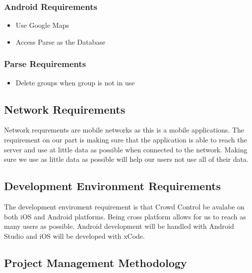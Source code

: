 \subsubsection{Android Requirements}
\begin{itemize}
\item{Use Google Maps}
\item{Access Parse as the Database}
\end{itemize}
\subsubsection{Parse Requirements}
\begin{itemize}
\item{Delete groups when group is not in use}
\end{itemize}

\subsection{Network Requirements}

Network requrements are mobile networks as this is a mobile applications. The requirement on our part is making sure that the application is able to reach the server and use at little data as possible when connected to the network. Making sure we use as little data as possible will help our users not use all of their data. 

\subsection{Development Environment Requirements}

The development enviroment requirement is that Crowd Control be avalabe on both iOS and Android platforms. Being cross platform allows for us to reach as many users as possible. Android development will be handled with Android Studio and iOS will be developed with xCode.


\subsection{Project  Management Methodology}

